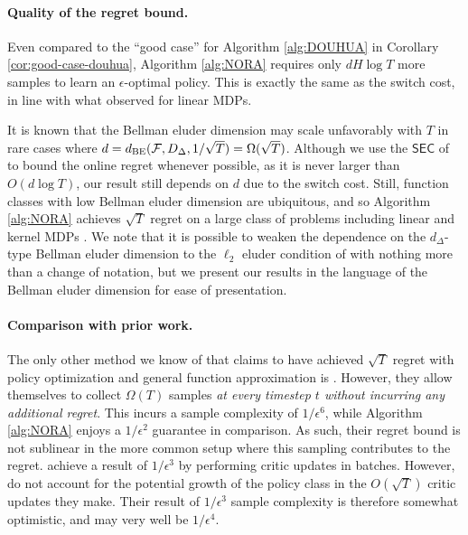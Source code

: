 \paragraph{Quality of the regret bound.} 
Even compared to the ``good case'' for Algorithm \ref{alg:DOUHUA} in Corollary \ref{cor:good-case-douhua}, Algorithm \ref{alg:NORA} requires only $dH \log T$ more samples to learn an $\epsilon$-optimal policy. This is exactly the same as the switch cost, in line with what \citet{cassel2024warm} observed for linear MDPs. 


It is known that the Bellman eluder dimension may scale unfavorably with $T$ in rare cases \citep{xie2022role} where $d = d_{\text{BE}}({\mathcal{F}}, D_\Delta, 1/\sqrt{T}) = \Omega(\sqrt{T})$. Although we use the $\mathsf{SEC}$ of \citet{xie2022role} to bound the online regret whenever possible, as it is never larger than $O(d\log T)$, our result still depends on $d$ due to the switch cost. Still, function classes with low Bellman eluder dimension are ubiquitous, and so Algorithm \ref{alg:NORA} achieves $\sqrt{T}$ regret on a large class of problems including linear and kernel MDPs \citep{jin2021bellmaneluder}. We note that it is possible to weaken the dependence on the $d_\Delta$-type Bellman eluder dimension to the $\ell_2$ eluder condition of \cite{xiong2023generalframeworksequentialdecisionmaking} with nothing more than a change of notation, but we present our results in the language of the Bellman eluder dimension for ease of presentation.


\paragraph{Comparison with prior work.} The only other method we know of that claims to have achieved $\sqrt{T}$ regret with policy optimization and general function approximation is \citet{zhou2023offline}. However, they allow themselves to collect $\Omega(T)$ samples \textit{at every timestep $t$ without incurring any additional regret}. This incurs a sample complexity of $1/\epsilon^6$, while Algorithm \ref{alg:NORA} enjoys a $1/\epsilon^2$ guarantee in comparison. As such, their regret bound is not sublinear in the more common setup where this sampling contributes to the regret. 
\citet{liu2023optimistic} achieve a result of $1/\epsilon^3$ by performing critic updates in batches. However, \citet{liu2023optimistic} do not account for the potential growth of the policy class in the $O(\sqrt{T})$ critic updates they make. Their result of $1/\epsilon^3$ sample complexity is therefore somewhat optimistic, and may very well be $1/\epsilon^4$. 



